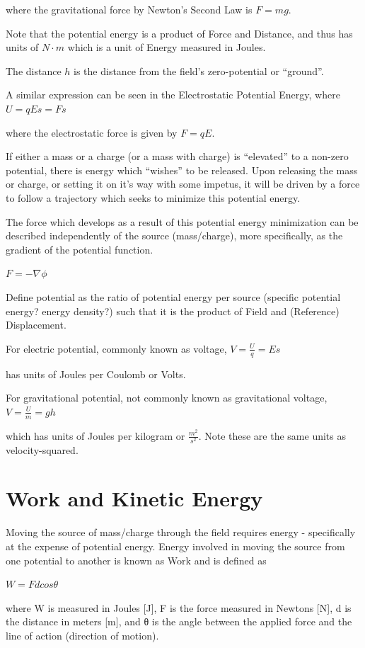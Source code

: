\documentclass[
  letterpaper,
  DIV=11,
  numbers=noendperiod]{scrartcl}
\begin{document}
where the gravitational force by Newton's Second Law is \(F=mg\).

Note that the potential energy is a product of Force and Distance, and
thus has units of \(N\cdot m\) which is a unit of Energy measured in
Joules.

The distance \(h\) is the distance from the field's zero-potential or
``ground''.

A similar expression can be seen in the Electrostatic Potential Energy,
where \(U = qEs = Fs\)

where the electrostatic force is given by \(F=qE\).

If either a mass or a charge (or a mass with charge) is ``elevated'' to
a non-zero potential, there is energy which ``wishes'' to be released.
Upon releasing the mass or charge, or setting it on it's way with some
impetus, it will be driven by a force to follow a trajectory which seeks
to minimize this potential energy.

The force which develops as a result of this potential energy
minimization can be described independently of the source (mass/charge),
more specifically, as the gradient of the potential function.

\(F = -\nabla\phi\)

Define potential as the ratio of potential energy per source (specific
potential energy? energy density?) such that it is the product of Field
and (Reference) Displacement.

For electric potential, commonly known as voltage, \(V=\frac{U}{q}=Es\)

has units of Joules per Coulomb or Volts.

For gravitational potential, not commonly known as gravitational
voltage, \(V=\frac{U}{m}=gh\)

which has units of Joules per kilogram or \(\frac{m^2}{s^2}\). Note
these are the same units as velocity-squared.

\section{Work and Kinetic Energy}\label{work-and-kinetic-energy}

Moving the source of mass/charge through the field requires energy -
specifically at the expense of potential energy. Energy involved in
moving the source from one potential to another is known as Work and is
defined as

\(W = Fdcos\theta\)

where W is measured in Joules {[}J{]}, F is the force measured in
Newtons {[}N{]}, d is the distance in meters {[}m{]}, and θ is the angle
between the applied force and the line of action (direction of motion).
\end{document}
